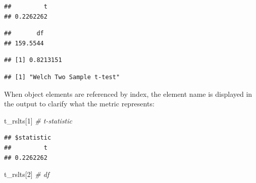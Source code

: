 \documentclass[
]{book}
\newenvironment{Shaded}{\begin{snugshade}}{\end{snugshade}}
\newcommand{\CommentTok}[1]{\textcolor[rgb]{0.56,0.35,0.01}{\textit{#1}}}
\newcommand{\DecValTok}[1]{\textcolor[rgb]{0.00,0.00,0.81}{#1}}
\newcommand{\NormalTok}[1]{#1}
\newcommand{\SpecialCharTok}[1]{\textcolor[rgb]{0.00,0.00,0.00}{#1}}
\begin{document}
\begin{verbatim}
##         t 
## 0.2262262
\end{verbatim}

\begin{Shaded}
\end{Shaded}

\begin{verbatim}
##       df 
## 159.5544
\end{verbatim}

\begin{Shaded}
\end{Shaded}

\begin{verbatim}
## [1] 0.8213151
\end{verbatim}

\begin{Shaded}
\end{Shaded}

\begin{verbatim}
## [1] "Welch Two Sample t-test"
\end{verbatim}

When object elements are referenced by index, the element name is displayed in the output to clarify what the metric represents:

\begin{Shaded}
\begin{Highlighting}[]
\NormalTok{t\_rslts[}\DecValTok{1}\NormalTok{] }\CommentTok{\# t{-}statistic}
\end{Highlighting}
\end{Shaded}

\begin{verbatim}
## $statistic
##         t 
## 0.2262262
\end{verbatim}

\begin{Shaded}
\begin{Highlighting}[]
\NormalTok{t\_rslts[}\DecValTok{2}\NormalTok{] }\CommentTok{\# df}
\end{Highlighting}
\end{Shaded}
\end{document}
